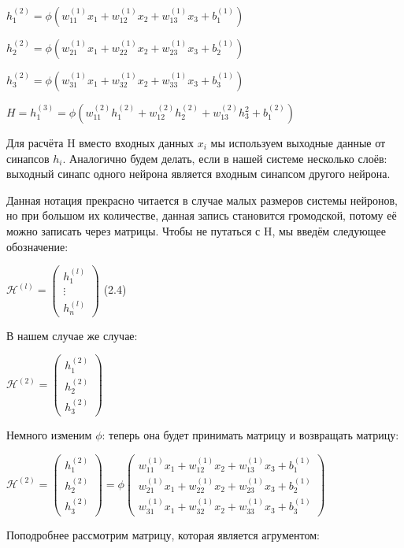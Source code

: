 \documentclass[12pt]{extarticle}
\begin{document}
	\centerline{$h_1^{(2)} = \phi(w_{11}^{(1)}x_1 + w_{12}^{(1)}x_2  + w_{13}^{(1)}x_3 + b_1^{(1)})$}
	\centerline{$h_2^{(2)} = \phi(w_{21}^{(1)}x_1 + w_{22}^{(1)}x_2  + w_{23}^{(1)}x_3 + b_2^{(1)})$}
	\centerline{$h_3^{(2)} = \phi(w_{31}^{(1)}x_1 + w_{32}^{(1)}x_2  + w_{33}^{(1)}x_3 + b_3^{(1)})$}
	\centerline{$H = h_1^{(3)} = \phi(w_{11}^{(2)}h_1^{(2)} + w_{12}^{(2)}h_2^{(2)}   + w_{13}^{(2)}h_3^{2} + b_1^{(2)})$}
	
	Для расчёта H вместо входных данных $x_i$ мы используем выходные данные от синапсов $h_i$. Аналогично будем делать, если в нашей системе несколько слоёв: выходный синапс одного нейрона является входным синапсом другого нейрона.
	
	Данная нотация прекрасно читается в случае малых размеров системы нейронов, но при большом их количестве, данная запись становится громодской, потому её можно записать через матрицы. 
	Чтобы не путаться с H, мы введём следующее обозначение:
	
	\centerline{ $\mathcal{H}^{(l)} = \begin{pmatrix}
		h_1^{(l)} \\
		\vdots \\
		h_n^{(l)}
	\end{pmatrix}$ (2.4)}
	
	В нашем случае же случае:
	
	\centerline{$\mathcal{H}^{(2)} = \begin{pmatrix}
		h_1^{(2)} \\
		h_2^{(2)} \\
		h_3^{(2)}
	\end{pmatrix}$}
	
	Немного изменим $\phi$: теперь она будет принимать матрицу и возвращать матрицу:
	
	\centerline{$\mathcal{H}^{(2)} = \begin{pmatrix}
		h_1^{(2)} \\
		h_2^{(2)} \\
		h_3^{(2)}
	\end{pmatrix} = \phi\begin{pmatrix}
		w_{11}^{(1)}x_1 + w_{12}^{(1)}x_2  + w_{13}^{(1)}x_3 + b_1^{(1)} \\
		w_{21}^{(1)}x_1 + w_{22}^{(1)}x_2  + w_{23}^{(1)}x_3 + b_2^{(1)} \\
		w_{31}^{(1)}x_1 + w_{32}^{(1)}x_2  + w_{33}^{(1)}x_3 + b_3^{(1)} \end{pmatrix}$}
	\newpage
	Поподробнее рассмотрим матрицу, которая является агрументом:
	
\end{document}
